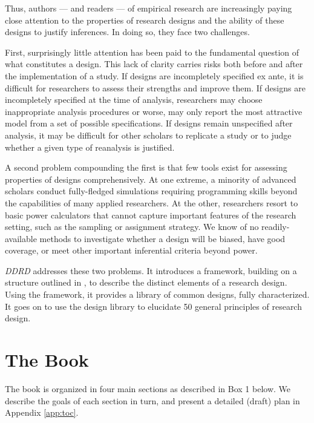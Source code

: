 \documentclass[11pt]{article}
\begin{document}
Thus, authors --- and readers --- of empirical research are increasingly paying close attention to the properties of research designs and the ability of these designs to justify inferences. In doing so, they face two challenges.  

First, surprisingly little attention has been paid to the fundamental question of what constitutes a design. This lack of clarity carries risks both before and after the implementation of a study. If designs are incompletely specified ex ante, it is difficult for researchers to assess their strengths and improve them. If designs are incompletely specified at the time of analysis, researchers may choose inappropriate analysis procedures or worse, may only report the most attractive model from a set of possible specifications. If designs remain unspecified after analysis, it may be difficult for other scholars to replicate a study or to judge whether a given type of reanalysis is justified. 

A second problem compounding the first is that few tools exist for assessing properties of designs comprehensively. At one extreme, a minority of advanced scholars conduct fully-fledged simulations requiring programming skills beyond the capabilities of many applied researchers. At the other, researchers resort to basic power calculators that cannot capture important features of the research setting, such as the sampling or assignment strategy. We know of no readily-available methods to investigate whether a design will be biased, have good coverage, or meet other important inferential criteria beyond power. 

{\it DDRD} addresses these two problems. It introduces a framework, building on a structure outlined in \citet{king1994designing}, to describe the distinct elements of a research design. Using the framework, it provides a library of common designs, fully characterized. It goes on to use the design library to elucidate 50 general principles of research design.
\newpage
\section{The Book}

The book is organized in four main sections as described in Box 1 below. We describe the goals of each section in turn, and present a detailed (draft) plan in Appendix \ref{app:toc}.
\end{document}

